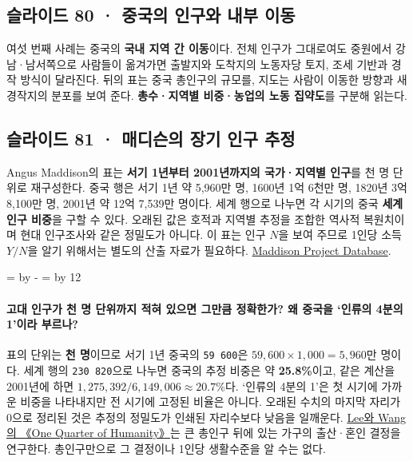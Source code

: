 \documentclass[10pt,a4paper]{article}
\newcommand{\ReserveQuestionSpace}{%
  \par\begingroup
  \dimen0=\pagegoal \advance\dimen0 by -\pagetotal
  \dimen2=\baselineskip \multiply\dimen2 by 12
  \ifdim\dimen0<\dimen2 \newpage\fi
  \endgroup}
\begin{document}
\subsection{슬라이드 80 · 중국의 인구와 내부 이동}
여섯 번째 사례는 중국의 \textbf{국내 지역 간 이동}이다. 전체 인구가 그대로여도 중원에서 강남·남서쪽으로 사람들이 옮겨가면 출발지와 도착지의 노동자당 토지, 조세 기반과 경작 방식이 달라진다. 뒤의 표는 중국 총인구의 규모를, 지도는 사람이 이동한 방향과 새 경작지의 분포를 보여 준다. \textbf{총수·지역별 비중·농업의 노동 집약도}를 구분해 읽는다.\par

\subsection{슬라이드 81 · 매디슨의 장기 인구 추정}
Angus Maddison의 표는 \textbf{서기 1년부터 2001년까지의 국가·지역별 인구}를 천 명 단위로 재구성한다. 중국 행은 서기 1년 약 5,960만 명, 1600년 1억 6천만 명, 1820년 3억 8,100만 명, 2001년 약 12억 7,539만 명이다. 세계 행으로 나누면 각 시기의 중국 \textbf{세계 인구 비중}을 구할 수 있다. 오래된 값은 호적과 지역별 추정을 조합한 역사적 복원치이며 현대 인구조사와 같은 정밀도가 아니다. 이 표는 인구 $N$을 보여 주므로 1인당 소득 $Y/N$을 알기 위해서는 별도의 산출 자료가 필요하다. \href{https://www.rug.nl/ggdc/historicaldevelopment/maddison/}{Maddison Project Database}.\par

\ReserveQuestionSpace
\paragraph{고대 인구가 천 명 단위까지 적혀 있으면 그만큼 정확한가? 왜 중국을 ‘인류의 4분의 1’이라 부르나?}
표의 단위는 \textbf{천 명}이므로 서기 1년 중국의 \texttt{59 600}은 $59{,}600\times1{,}000=5{,}960$만 명이다. 세계 행의 \texttt{230 820}으로 나누면 중국의 추정 비중은 약 \textbf{25.8\%}이고, 같은 계산을 2001년에 하면 $1{,}275{,}392/6{,}149{,}006\approx20.7\%$다. ‘인류의 4분의 1’은 첫 시기에 가까운 비중을 나타내지만 전 시기에 고정된 비율은 아니다. 오래된 수치의 마지막 자리가 0으로 정리된 것은 추정의 정밀도가 인쇄된 자리수보다 낮음을 일깨운다. \href{https://www.jstor.org/stable/j.ctvjf9vt6}{Lee와 Wang의 《One Quarter of Humanity》}는 큰 총인구 뒤에 있는 가구의 출산·혼인 결정을 연구한다. 총인구만으로 그 결정이나 1인당 생활수준을 알 수는 없다.\par
\end{document}

